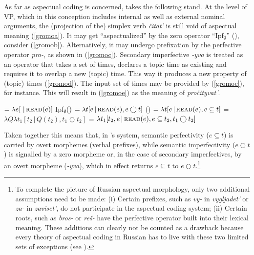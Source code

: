 \documentclass[output=paper,colorlinks,citecolor=brown]{langscibook}
\begin{document}
As far as aspectual coding is concerned, \citet{Gronn2004} 
takes %
the following stand.
At the level of VP, which in this conception includes internal as well as external nominal arguments, the (projection of the) simplex verb \textit{čitat'} is still void of aspectual meaning (\ref{gromoa}). It may get ``aspectualized'' by
the zero operator ``Ipf$_\emptyset$'' (\citealt[53]{Gronn2004}), consider (\ref{gromob}).
Alternatively, it may undergo prefixation by the perfective operator \textit{pro-}, as shown in (\ref{gromoc}). 
Secondary imperfective \textit{-yva} is treated as an operator that takes a set of times, declares a topic time as existing and requires it to overlap a new (topic) time. This way it produces a new pro\-perty of (topic) times (\ref{gromod}).  
The input set of times may be provided by (\ref{gromoc}), for instance.  
This will result in (\ref{gromoe}) as the meaning of \textit{pročityvat'}.

\ea\label{gromo}
\ea {} $ = \lambda e [\,\,|\,\textsc{read}(e)]$ \label{gromoa}
\ex Ipf$_\emptyset$() $ = \lambda t [e\,|\, \textsc{read}(e), e \bigcirc t]$ \label{gromob}
\ex {}() $ = \lambda t [e\,|\, \textsc{read}(e), e \subseteq t]$ \label{gromoc}
\ex {} = $\lambda Q \lambda t_1 [t_2\,|\, Q(t_2), t_1 \bigcirc t_2]$ \label{gromod}
\ex {} = $\lambda t_1 [t_2, e\,|\, \textsc{read}(e), e \subseteq t_2, t_1 \bigcirc t_2]$ \label{gromoe}
\z\z

\noindent Taken together this means that, in \citeauthor{Gronn2004}%
's system, semantic perfectivity ($e \subseteq t$) is carried by overt morphemes (verbal prefixes), while 
semantic imperfectivity ($e \bigcirc t$) is signalled by a zero morpheme or, in the case of secondary imperfectives, by an overt morpheme (\textit{-yva}), which in effect returns $e \subseteq t$ to $e \bigcirc t$.\footnote{\label{livewith}To complete the picture of Russian aspectual morphology, only two additional assumptions need to be made: (i) Certain prefixes, such as \textit{vy-} in \textit{vygljadet'} or \textit{za-} in  \textit{zaviset'}, do not participate in the aspectual coding system; (ii) Certain roots, such as \textit{bros-} or \textit{reš-} have the perfective operator built into their lexical meaning. These additions can clearly not be counted as a drawback because every theory of aspectual coding in Russian has to live with these two limited sets of exceptions (see \citealt{zaliznjaksmelev97}).}
\end{document}
